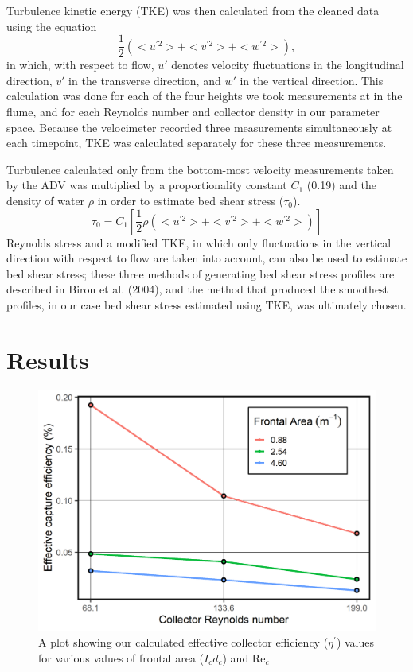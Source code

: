 \documentclass{scrreprt}
\newcommand\Rey{\mathrm{Re}}
\begin{document}
Turbulence kinetic energy (TKE) was then calculated from the cleaned data using the equation 
\[\frac{1}{2}(<u^{'2}> + <v^{'2}> + <w^{'2}>),\]
in which, with respect to flow, $u'$ denotes velocity fluctuations in the longitudinal direction, $v'$ in the transverse direction, and $w'$ in the vertical direction. This calculation was done for each of the four heights we took measurements at in the flume, and for each Reynolds number and collector density in our parameter space. Because the velocimeter recorded three measurements simultaneously at each timepoint, TKE was calculated separately for these three measurements. 

Turbulence calculated only from the bottom-most velocity measurements taken by the ADV was multiplied by a proportionality constant $C_{1}$ (0.19) and the density of water $\rho$ in order to estimate bed shear stress ($\tau_{0}$).
\[\tau_{0} = C_{1}[\frac{1}{2}\rho(<u^{'2}> + <v^{'2}> + <w^{'2}>)]\]
Reynolds stress and a modified TKE, in which only fluctuations in the vertical direction with respect to flow are taken into account, can also be used to estimate bed shear stress; these three methods of generating bed shear stress profiles are described in Biron et al. (2004), and the method that produced the smoothest profiles, in our case bed shear stress estimated using TKE, was ultimately chosen.  


\chapter{Results}

\begin{figure}[htbp]
\includegraphics[width=6in]{etafig.png}
\centering
\caption{A plot showing our calculated effective collector efficiency ($\eta^\prime$) values for various values of frontal area ($I_cd_c$) and $\Rey_c$}
\label{fig:eta}
\end{figure}
\end{document}
